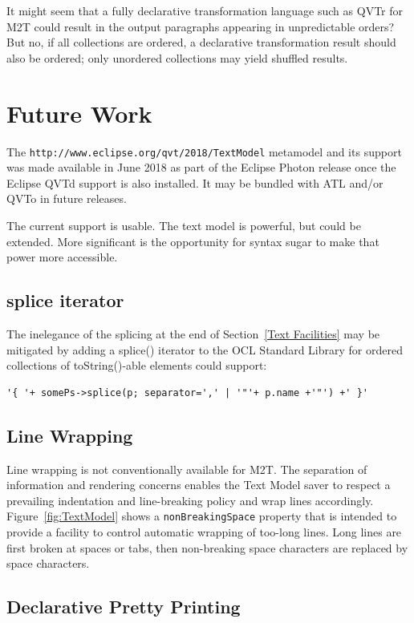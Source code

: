 \documentclass{llncs}
\begin{document}
It might seem that a fully declarative transformation language such as QVTr for M2T could result in the output paragraphs appearing in unpredictable orders? But no, if all collections are ordered, a declarative transformation result should also be ordered; only unordered collections may yield shuffled results.

\section{Future Work}\label{Future Work}

The \verb$http://www.eclipse.org/qvt/2018/TextModel$ metamodel and its support was made available in June 2018 as part of the Eclipse Photon release once the Eclipse QVTd support is also installed. It may be bundled with ATL and/or QVTo in future releases.

The current support is usable. The text model is powerful, but could be extended. More significant is the opportunity for syntax sugar to make that power more accessible.

\subsection{splice iterator}

The inelegance of the splicing at the end of Section~\ref{Text Facilities} may be mitigated by adding a splice() iterator to the OCL Standard Library for ordered collections of toString()-able elements could support:

\begin{verbatim}
'{ '+ somePs->splice(p; separator=',' | '"'+ p.name +'"') +' }'
\end{verbatim}

\subsection{Line Wrapping}\label{Line Wrapping}

Line wrapping is not conventionally available for M2T. The separation of information and rendering concerns enables the Text Model saver to respect a prevailing indentation and line-breaking policy and wrap lines accordingly. Figure~\ref{fig:TextModel}  shows a \verb$nonBreakingSpace$ property that is intended to provide a facility to control automatic wrapping of too-long lines. Long lines are first broken at spaces or tabs, then non-breaking space characters are replaced by space characters.

\subsection{Declarative Pretty Printing}\label{Declarative Pretty Printing}
\end{document}
